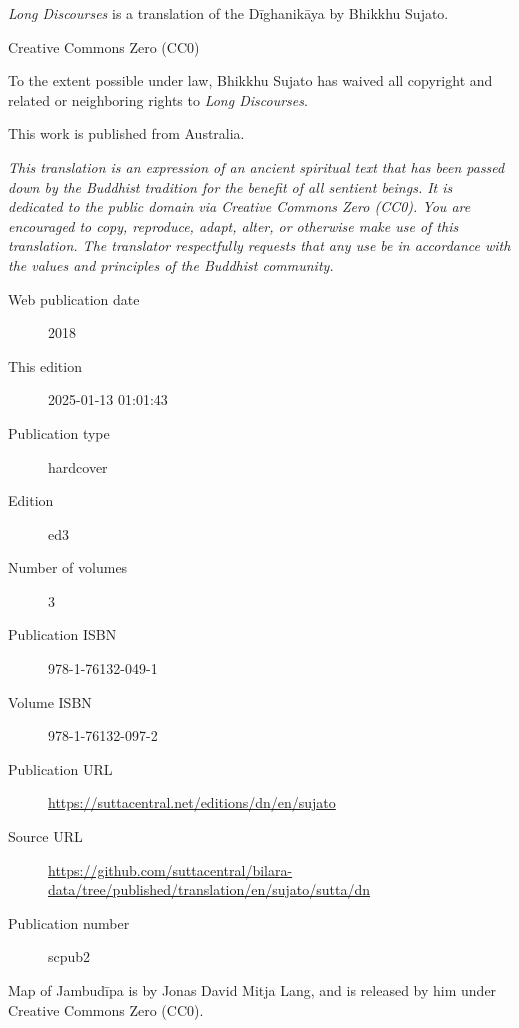 \documentclass[12pt,openany]{book}%
\begin{document}
\begin{footnotesize}

\textit{Long Discourses} is a translation of the Dīghanikāya by Bhikkhu Sujato.

\medskip

Creative Commons Zero (CC0)

To the extent possible under law, Bhikkhu Sujato has waived all copyright and related or neighboring rights to \textit{Long Discourses}.

\medskip

This work is published from Australia.

\begin{center}
\textit{This translation is an expression of an ancient spiritual text that has been passed down by the Buddhist tradition for the benefit of all sentient beings. It is dedicated to the public domain via Creative Commons Zero (CC0). You are encouraged to copy, reproduce, adapt, alter, or otherwise make use of this translation. The translator respectfully requests that any use be in accordance with the values and principles of the Buddhist community.}
\end{center}

\medskip

\begin{description}
    \item[Web publication date] 2018
    \item[This edition] 2025-01-13 01:01:43
    \item[Publication type] hardcover
    \item[Edition] ed3
    \item[Number of volumes] 3
    \item[Publication ISBN] 978-1-76132-049-1
    \item[Volume ISBN] 978-1-76132-097-2
    \item[Publication URL] \href{https://suttacentral.net/editions/dn/en/sujato}{https://suttacentral.net/editions/dn/en/sujato}
    \item[Source URL] \href{https://github.com/suttacentral/bilara-data/tree/published/translation/en/sujato/sutta/dn}{https://github.com/suttacentral/bilara-data/tree/published/translation/en/sujato/sutta/dn}
    \item[Publication number] scpub2
\end{description}

\medskip

Map of Jambudīpa is by Jonas David Mitja Lang, and is released by him under Creative Commons Zero (CC0).


\end{footnotesize}
\end{document}
